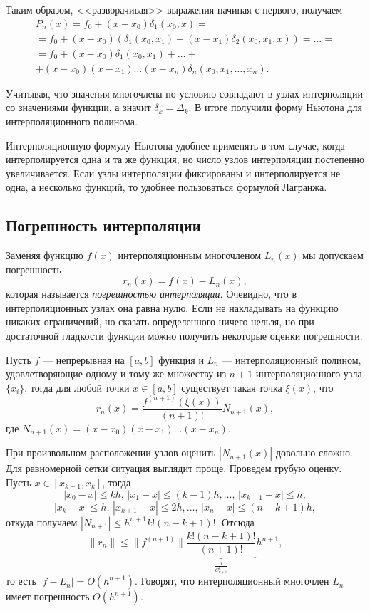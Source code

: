 Таким образом, <<разворачивая>> выражения начиная с первого, получаем
\begin{multline*}
P_{n}(x)=f_{0}+(x-x_{0})\delta_{1}(x_{0},x)=\\
=f_{0}+(x-x_{0})\left(\delta_{1}(x_{0},x_{1})-(x-x_{1})\delta_{2}(x_{0},x_{1},x)\right)=\dots=\\
=f_{0}+(x-x_{0})\delta_{1}(x_{0},x_{1})+\dots+\\
+(x-x_{0})(x-x_{1})\dots(x-x_{n})\delta_{n}(x_{0},x_{1},\dots,x_{n}).
\end{multline*}


Учитывая, что значения многочлена по условию совпадают в узлах
интерполяции со значениями функции, а значит
$\delta_{k}=\Delta_{k}$. В итоге получили форму Ньютона для
интерполяционного полинома.

Интерполяционную формулу Ньютона удобнее применять в том случае, когда
интерполируется одна и та же функция, но число узлов интерполяции
постепенно увеличивается. Если узлы интерполяции фиксированы и
интерполируется не одна, а несколько функций, то удобнее пользоваться
формулой Лагранжа.

\subsection{Погрешность интерполяции}

Заменяя функцию $f(x)$ интерполяционным многочленом $L_{n}(x)$ мы
допускаем погрешность
\[
r_{n}(x)=f(x)-L_{n}(x),
\]
которая называется \emph{погрешностью интерполяции}. Очевидно, что в
интерполяционных узлах она равна нулю. Если не накладывать на функцию
никаких ограничений, но сказать определенного ничего нельзя, но при
достаточной гладкости функции можно получить некоторые оценки
погрешности.

Пусть $f$ --- непрерывная на $[a,b]$ функция и $L_{n}$ ---
интерполяционный полином, удовлетворяющие одному и тому же множеству
из $n+1$ интерполяционного узла $\{x_{i}\}$, тогда для любой точки
$x\in[a,b]$ существует такая точка $\xi(x)$, что
\[
r_{n}(x)=\frac{f^{(n+1)}\left(\xi(x)\right)}{(n+1)!}N_{n+1}(x),
\]
где $N_{n+1}(x)=(x-x_{0})(x-x_{1})\dots(x-x_{n})$.

При произвольном расположении узлов оценить $|N_{n+1}(x)|$ довольно
сложно. Для равномерной сетки ситуация выглядит проще. Проведем грубую
оценку. Пусть $x\in[x_{k-1},x_{k}]$, тогда
\[
|x_{0}-x|\leqslant kh,\,|x_{1}-x|\leqslant(k-1)h,\dots,\,|x_{k-1}-x|\leqslant h,
\]
\[
|x_{k}-x|\leqslant h,\,|x_{k+1}-x|\leqslant2h,\dots,\,|x_{n}-x|\leqslant(n-k+1)h,
\]
откуда получаем $|N_{n+1}|\leqslant h^{n+1}k!(n-k+1)!$. Отсюда
\[
\|r_{n}\|\leqslant\|f^{(n+1)}\|\underset{\frac{1}{C_{n+1}^{k}}}{\underbrace{\frac{k!(n-k+1)!}{(n+1)!}}}h^{n+1},
\]
то есть $|f-L_{n}|=O(h^{n+1})$. Говорят, что интерполяционный многочлен
$L_{n}$ имеет погрешность $O(h^{n+1})$.

